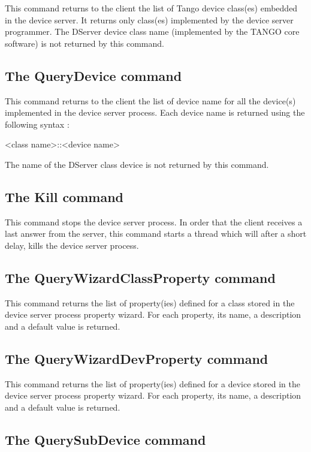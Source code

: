 This command returns to the client the list of Tango device class(es)
embedded in the device server. It returns only class(es) implemented
by the device server programmer. The DServer device class name (implemented
by the TANGO core software) is not returned by this command.

\subsection{The QueryDevice command}

This command returns to the client the list of device name for all
the device(s) implemented in the device server process. Each device
name is returned using the following syntax : \begin{center}<class
name>::<device name>\end{center}

The name of the DServer class device is not returned by this command.

\subsection{The Kill command}

This command stops the device server process. In order that the client
receives a last answer from the server, this command starts a thread
which will after a short delay, kills the device server process.

\subsection{The QueryWizardClassProperty command}

This command returns the list of property(ies) defined for a class
stored in the device server process property wizard. For each property,
its name, a description and a default value is returned.

\subsection{The QueryWizardDevProperty command}

This command returns the list of property(ies) defined for a device
stored in the device server process property wizard. For each property,
its name, a description and a default value is returned.

\subsection{The QuerySubDevice command}

